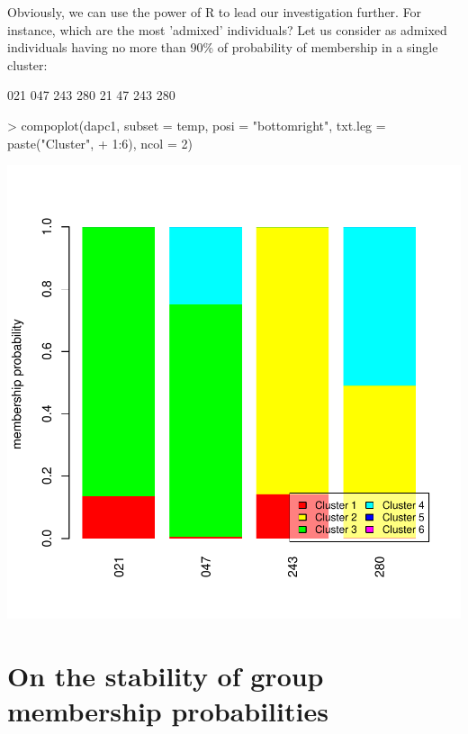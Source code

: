 \documentclass{article}
\begin{document}
Obviously, we can use the power of R to lead our investigation further. For instance, which are the
most 'admixed' individuals?
Let us consider as admixed individuals having no more than 90\% of probability of membership in a single cluster:
\begin{Schunk}
\begin{Soutput}
021 047 243 280 
 21  47 243 280 
\end{Soutput}
\begin{Sinput}
> compoplot(dapc1, subset = temp, posi = "bottomright", txt.leg = paste("Cluster", 
+     1:6), ncol = 2)
\end{Sinput}
\end{Schunk}
\includegraphics{figs/dapc-025}





\section{On the stability of group membership probabilities}


\end{document}
